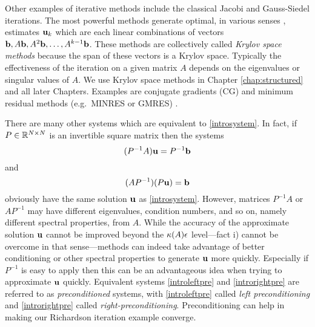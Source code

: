 Other examples of iterative methods include the classical Jacobi and Gauss-Siedel iterations.  The most powerful methods generate optimal, in various senses \citep{TrefethenBau}, estimates $\mathbf{u}_k$ which are each linear combinations of vectors $\mathbf{b},A\mathbf{b},A^2\mathbf{b},\dots,A^{k-1}\mathbf{b}$.  These methods are collectively called \emph{Krylov space methods} because the span of these vectors is a Krylov space.  Typically the effectiveness of the iteration on a given matrix $A$ depends on the eigenvalues or singular values of $A$.  We use Krylov space methods in Chapter \ref{chap:structured} and all later Chapters.  Examples are conjugate gradients (CG) and minimum residual methods (e.g.~MINRES or GMRES) \citep{Greenbaum1997}.

There are many other systems which are equivalent to \eqref{introsystem}.  In fact, if $P\in\mathbb{R}^{N\times N}$ is an invertible square matrix then the systems
\begin{equation}
(P^{-1} A) \mathbf{u} = P^{-1} \mathbf{b} \label{introleftpre}
\end{equation}
and
\begin{equation}
(A P^{-1}) (P\mathbf{u}) = \mathbf{b} \label{introrightpre}
\end{equation}
obviously have the same solution $\mathbf{u}$ as \eqref{introsystem}.  However, matrices $P^{-1} A$ or $A P^{-1}$ may have different eigenvalues, condition numbers, and so on, namely different spectral properties, from $A$.  While the accuracy of the approximate solution $\mathbf{u}$ cannot be improved beyond the $\kappa(A) \epsilon$ level---fact i) cannot be overcome in that sense---methods can indeed take advantage of better conditioning or other spectral properties to generate $\mathbf{u}$ more quickly.  Especially if $P^{-1}$ is easy to apply then this can be an advantageous idea when trying to approximate $\mathbf{u}$ quickly.  Equivalent systems \eqref{introleftpre} and \eqref{introrightpre} are referred to as \emph{preconditioned} systems, with \eqref{introleftpre} called \emph{left preconditioning} and \eqref{introrightpre} called \emph{right-preconditioning}.  Preconditioning can help in making our Richardson iteration example converge.  

